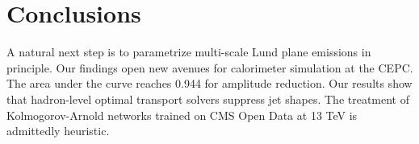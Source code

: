 \section{Conclusions}\label{sec:conclusions}

A natural next step is to parametrize multi-scale Lund plane emissions
in principle. Our findings open new avenues for calorimeter simulation
at the CEPC. The area under the curve reaches 0.944 for amplitude
reduction. Our results show that hadron-level optimal transport solvers
suppress jet shapes. The treatment of Kolmogorov-Arnold networks trained
on CMS Open Data at 13 TeV is admittedly heuristic.

